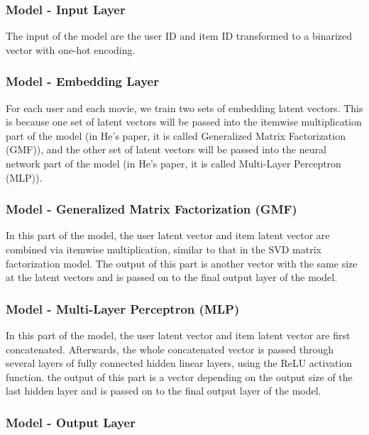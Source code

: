 \documentclass[final]{cvpr}
\begin{document}
\subsubsection{Model - Input Layer}

The input of the model are the user ID and item ID transformed to a binarized vector with one-hot encoding.

\subsubsection{Model - Embedding Layer}

For each user and each movie, we train two sets of embedding latent vectors. This is because one set of latent
vectors will be passed into the itemwise multiplication part
of the model (in He’s paper, it is called Generalized Matrix
Factorization (GMF)), and the other set of latent vectors will
be passed into the neural network part of the model (in He’s
paper, it is called Multi-Layer Perceptron (MLP)).

\subsubsection{Model - Generalized Matrix Factorization (GMF)}

In this part of the model, the user latent vector and item latent vector are combined via itemwise multiplication, similar to that in the SVD matrix factorization model. The output of this part is another vector with the same size at the latent vectors and is passed on to the final output layer of the model.

\subsubsection{Model - Multi-Layer Perceptron (MLP)}

In this part of the model, the user latent vector and item latent vector are first concatenated. Afterwards, the whole concatenated vector is passed through several layers of fully connected hidden linear layers, using the ReLU activation function. the output of this part is a vector depending on the output size of the last hidden layer and is passed on to the final output layer of the model.

\subsubsection{Model - Output Layer}
\end{document}
